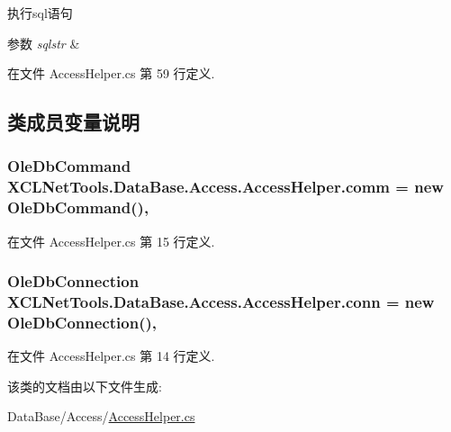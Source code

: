 执行sql语句 


\begin{DoxyParams}{参数}
{\em sqlstr} & \\
\hline
\end{DoxyParams}


在文件 Access\-Helper.\-cs 第 59 行定义.



\subsection{类成员变量说明}
\hypertarget{class_x_c_l_net_tools_1_1_data_base_1_1_access_1_1_access_helper_a11c37781255094b6abb069cf0b5c65df}{
\subsubsection[{comm}]{\setlength{\rightskip}{0pt plus 5cm}Ole\-Db\-Command X\-C\-L\-Net\-Tools.\-Data\-Base.\-Access.\-Access\-Helper.\-comm = new Ole\-Db\-Command()\hspace{0.3cm}{\ttfamily [static]}, {\ttfamily [protected]}}}\label{class_x_c_l_net_tools_1_1_data_base_1_1_access_1_1_access_helper_a11c37781255094b6abb069cf0b5c65df}


在文件 Access\-Helper.\-cs 第 15 行定义.

\hypertarget{class_x_c_l_net_tools_1_1_data_base_1_1_access_1_1_access_helper_a6eacbf7cab97849252853ed926ffeb7e}{
\subsubsection[{conn}]{\setlength{\rightskip}{0pt plus 5cm}Ole\-Db\-Connection X\-C\-L\-Net\-Tools.\-Data\-Base.\-Access.\-Access\-Helper.\-conn = new Ole\-Db\-Connection()\hspace{0.3cm}{\ttfamily [static]}, {\ttfamily [protected]}}}\label{class_x_c_l_net_tools_1_1_data_base_1_1_access_1_1_access_helper_a6eacbf7cab97849252853ed926ffeb7e}


在文件 Access\-Helper.\-cs 第 14 行定义.



该类的文档由以下文件生成\-:\begin{DoxyCompactItemize}
\item 
Data\-Base/\-Access/\hyperlink{_access_helper_8cs}{Access\-Helper.\-cs}\end{DoxyCompactItemize}
